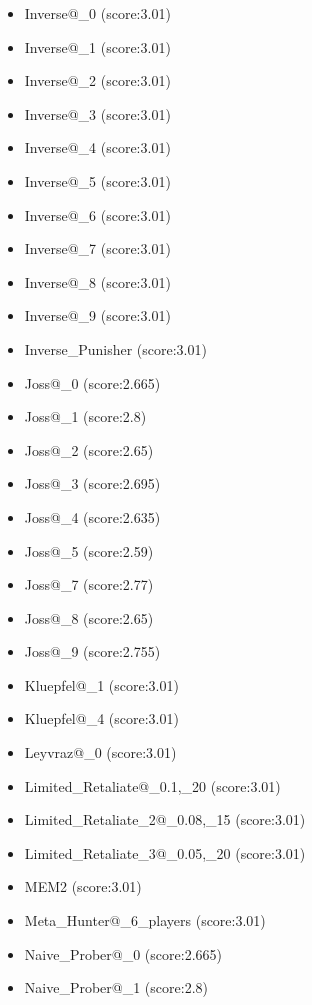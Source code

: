 \begin{appendices}
\begin{itemize}
\begin{multicols}{3}
\begin{itemize}
                \item Inverse@\_0 (score:3.01)
                \item Inverse@\_1 (score:3.01)
                \item Inverse@\_2 (score:3.01)
                \item Inverse@\_3 (score:3.01)
                \item Inverse@\_4 (score:3.01)
                \item Inverse@\_5 (score:3.01)
                \item Inverse@\_6 (score:3.01)
                \item Inverse@\_7 (score:3.01)
                \item Inverse@\_8 (score:3.01)
                \item Inverse@\_9 (score:3.01)
                \item Inverse\_Punisher (score:3.01)
                \item Joss@\_0 (score:2.665)
                \item Joss@\_1 (score:2.8)
                \item Joss@\_2 (score:2.65)
                \item Joss@\_3 (score:2.695)
                \item Joss@\_4 (score:2.635)
                \item Joss@\_5 (score:2.59)
                \item Joss@\_7 (score:2.77)
                \item Joss@\_8 (score:2.65)
                \item Joss@\_9 (score:2.755)
                \item Kluepfel@\_1 (score:3.01)
                \item Kluepfel@\_4 (score:3.01)
                \item Leyvraz@\_0 (score:3.01)
                \item Limited\_Retaliate@\_0.1,\_20 (score:3.01)
                \item Limited\_Retaliate\_2@\_0.08,\_15 (score:3.01)
                \item Limited\_Retaliate\_3@\_0.05,\_20 (score:3.01)
                \item MEM2 (score:3.01)
                \item Meta\_Hunter@\_6\_players (score:3.01)
                \item Naive\_Prober@\_0 (score:2.665)
                \item Naive\_Prober@\_1 (score:2.8)

\end{itemize}
\end{multicols}
\end{itemize}
\end{appendices}

